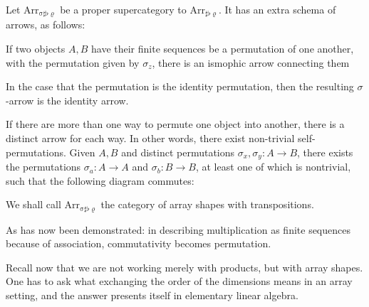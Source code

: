 \documentclass{DIKU-report-variant}
\newcommand\mrm[1]{\mathrm{#1}}
\newcommand\brm[1]{\bm{\mrm{#1}}}
\newcommand\Arr[1]{{\brm{Arr}_{\brm{#1}}}}
\newcommand\SFR{\sharp\flat\varrho}
\newcommand\SSFR{\sigma\sharp\flat\varrho}
\begin{document}
\begin{definition}
  \label{def:category-of-transposes}
  Let \(\Arr{\SSFR}\) be a proper supercategory to \(\Arr\SFR\).
  It has an extra schema of arrows, as follows:

  If two objects \(A, B\) have their finite sequences be
  a permutation of one another, with the permutation given by \(\sigma_z\),
  there is an ismophic arrow connecting them
  \begin{center}
  \end{center}
  
  In the case that the permutation is the identity permutation, then the
  resulting \(\sigma\)-arrow is the identity arrow.

  \begin{center}
  \end{center}

  If there are more than one way to permute one object into another, there is
  a distinct arrow for each way. In other words, there exist non-trivial self-permutations.
  Given \(A, B\) and distinct permutations \(\sigma_x, \sigma_y : A \to B\), there exists
  the permutations \(\sigma_a : A \to A\) and \(\sigma_b : B \to B\), at least one of which
  is nontrivial, such that the following diagram commutes:

  \begin{center}
  \end{center}

  We shall call \(\Arr{\SSFR}\) the category of array shapes with transpositions.
\end{definition}

As has now been demonstrated: in describing multiplication as finite sequences because of association,
commutativity becomes permutation.

Recall now that we are not working merely with products, but with array
shapes. One has to ask what exchanging the order of the dimensions means in
an array setting, and the answer presents itself in elementary linear algebra.
\end{document}

